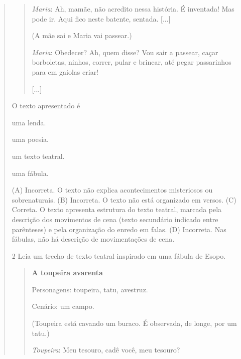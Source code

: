 \begin{boxlist}
\begin{quote}
\begin{quote}
\emph{Maria}: Ah, mamãe, não acredito nessa história. É inventada! Mas
pode ir. Aqui fico neste batente, sentada. {[}...{]}

(A mãe sai e Maria vai passear.)

\emph{Maria}: Obedecer? Ah, quem disse? Vou sair a passear, caçar
borboletas, ninhos, correr, pular e brincar, até pegar passarinhos para
em gaiolas criar!

{[}...{]}

\end{quote}

O texto apresentado é

\begin{escolha}
\item uma lenda.

\item uma poesia.

\item um texto teatral.

\item uma fábula.
\end{escolha}


(A) Incorreta. O texto não explica acontecimentos misteriosos ou
sobrenaturais.
(B) Incorreta. O texto não está organizado em versos.
(C) Correta. O texto apresenta estrutura do texto teatral, marcada pela
descrição dos movimentos de cena (texto secundário indicado entre
parênteses) e pela organização do enredo em falas.
(D) Incorreta. Nas fábulas, não há descrição de movimentações de cena.

\num{2} Leia um trecho de texto teatral inspirado em uma fábula de Esopo.

\begin{quote}
\textbf{A toupeira avarenta}

Personagens: toupeira, tatu, avestruz.

Cenário: um campo.

(Toupeira está cavando um buraco. É observada, de longe, por um tatu.)

\emph{Toupeira}: Meu tesouro, cadê você, meu tesouro?


\end{quote}
\end{quote}
\end{boxlist}
